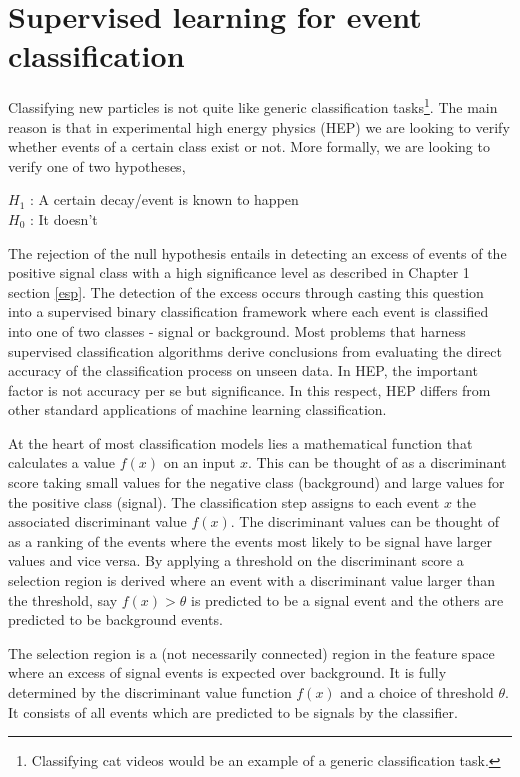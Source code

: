 
\section{Supervised learning for event classification}

Classifying new particles is not quite like generic classification tasks\footnote{Classifying cat videos would be an example of a generic classification task.}. The main reason is that in experimental high energy physics (HEP) we are looking to verify whether events of a certain class exist or not. More formally, we are looking to verify one of two hypotheses,

$H_{1}$ : A certain decay/event is known to happen \\
$H_{0}$ : It doesn't 

The rejection of the null hypothesis entails in detecting an excess of events of the positive signal class with a high significance level as described in Chapter 1 section \ref{esp}. The detection of the excess occurs through casting this question into a supervised binary classification framework where each event is classified into one of two classes - signal or background. Most problems that harness supervised classification algorithms derive conclusions from evaluating the direct accuracy of the classification process on unseen data. In HEP, the important factor is not accuracy per se but significance. In this respect, HEP differs from other standard applications of machine learning classification. 

At the heart of most classification models lies a mathematical function that calculates a value $f(x)$ on an input $x$. This can be thought of as a discriminant score taking small values for the  negative class (background) and large values for the positive class (signal). The classification step assigns to each event $x$ the associated discriminant value $f(x)$. The discriminant values can be thought of as a ranking of the events where the events most likely to be signal have larger values and vice versa. By applying a threshold on the discriminant score a selection region is derived where an event with a discriminant value larger than the threshold, say $f(x) > \theta$ is predicted to be a signal event and the others are predicted to be background events. 

The selection region is a (not necessarily connected) region in the feature space where an excess of signal events is expected over background. It is fully determined by the discriminant value function $f(x)$ and a choice of threshold $\theta$. It consists of all events which are predicted to be signals by the classifier.

